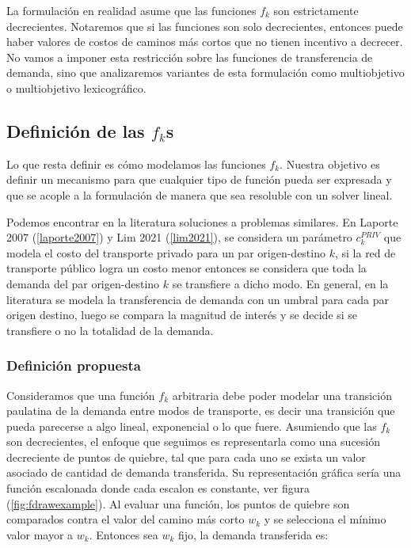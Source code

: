 \documentclass{article}
\begin{document}
  La formulación en realidad asume que las funciones $f_k$ son estrictamente decrecientes. Notaremos que si las funciones son solo decrecientes, entonces puede haber valores de costos de caminos más cortos que no tienen incentivo a decrecer. No vamos a imponer esta restricción sobre las funciones de transferencia de demanda, sino que analizaremos variantes de esta formulación como multiobjetivo o multiobjetivo lexicográfico.

  \subsection{Definición de las $f_k$s}

  Lo que resta definir es cómo modelamos las funciones $f_k$. Nuestra objetivo es definir un mecanismo para que cualquier tipo de función pueda ser expresada y que se acople a la formulación de manera que sea resoluble con un solver lineal.

  Podemos encontrar en la literatura soluciones a problemas similares. En Laporte 2007 (\ref{laporte2007}) y Lim 2021 (\ref{lim2021}), se considera un parámetro $c^{PRIV}_k$ que modela el costo del transporte privado para un par origen-destino $k$, si la red de transporte público logra un costo menor entonces se considera que toda la demanda del par origen-destino $k$ se transfiere a dicho modo. En general, en la literatura se modela la transferencia de demanda con un umbral para cada par origen destino, luego se compara la magnitud de interés y se decide si se transfiere o no la totalidad de la demanda.

  \subsubsection{Definición propuesta}

  Consideramos que una función $f_k$ arbitraria debe poder modelar una transición paulatina de la demanda entre modos de transporte, es decir una transición que pueda parecerse a algo lineal, exponencial o lo que fuere. Asumiendo que las $f_k$ son decrecientes, el enfoque que seguimos es representarla como una sucesión decreciente de puntos de quiebre, tal que para cada uno se exista un valor asociado de cantidad de demanda transferida. Su representación gráfica sería una función escalonada donde cada escalon es constante, ver figura (\ref{fig:fdrawexample}). Al evaluar una función, los puntos de quiebre son comparados contra el valor del camino más corto $w_k$ y se selecciona el mínimo valor mayor a $w_k$. Entonces sea $w_k$ fijo, la demanda transferida es:
\end{document}
